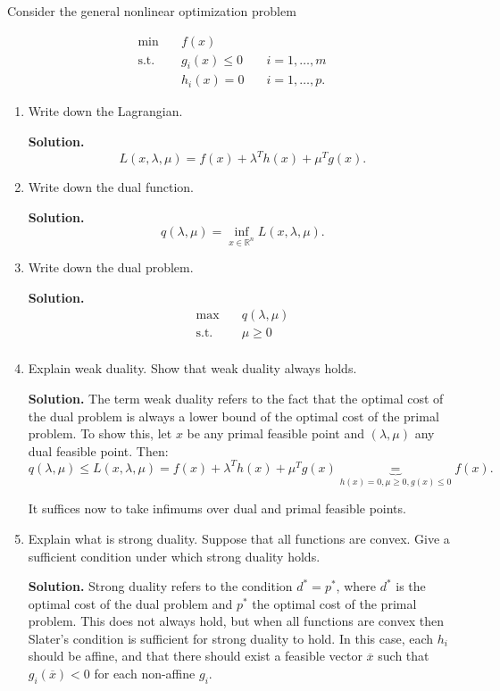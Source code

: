 \item Consider the general nonlinear optimization problem

  \[
    \begin{aligned}
      \min \quad & f(x) & \\
      \textrm{s.t.} \quad & g_i(x) \le 0 \quad & i=1,\ldots,m \\
                          & h_i(x) = 0 \quad & i=1,\ldots,p.
    \end{aligned}
  \] 

  \begin{enumerate}[label=(\alph*)]
    \item Write down the Lagrangian.

      \medskip\textbf{Solution.}
      \[
      L(x, \lambda, \mu) = f(x) + \lambda^T h(x) + \mu^T g(x)
      .\] 

    \item Write down the dual function.

      \medskip\textbf{Solution.}
      \[
      q(\lambda,\mu) = \inf_{x \in \mathbb{R}^n} L(x,\lambda,\mu)
      .\] 

    \item Write down the dual problem.

      \medskip\textbf{Solution.}
      \[
        \begin{aligned}
          \max \quad & q(\lambda,\mu) \\
          \textrm{s.t.} \quad & \mu\ge 0 \\
        \end{aligned}
      \] 

    \item Explain weak duality. Show that weak duality always holds.

      \medskip\textbf{Solution.} The term weak duality refers to the fact that the
      optimal cost of the dual problem is always a lower bound of the optimal
      cost of the primal problem. To show this, let $x$ be any primal feasible
      point and $(\lambda,\mu)$ any dual feasible point. Then:
      \[
        q(\lambda, \mu) \le 
        L(x, \lambda, \mu) = 
        f(x) + \lambda^T h(x) + \mu^T g(x) \underbrace{=}_{\text{$h(x)=0,\mu\ge 0,g(x)\le 0$}}
        f(x)
      .\] 

      It suffices now to take infimums over dual and primal feasible points.

    \item Explain what is strong duality. Suppose that all functions are convex.
      Give a sufficient condition under which strong duality holds.

       \medskip\textbf{Solution.} Strong duality refers to the condition
       $d^*=p^*$, where $d^*$ is the optimal cost of the dual problem and $p^*$
       the optimal cost of the primal problem. This does not always hold, but
       when all functions are convex then Slater's condition is sufficient for
       strong duality to hold. In this case, each $h_i$ should be affine, and
       that there should exist a feasible vector $\overline{x}$ such that
       $g_i(\overline{x})<0$ for each non-affine $g_i$.

  \end{enumerate}
